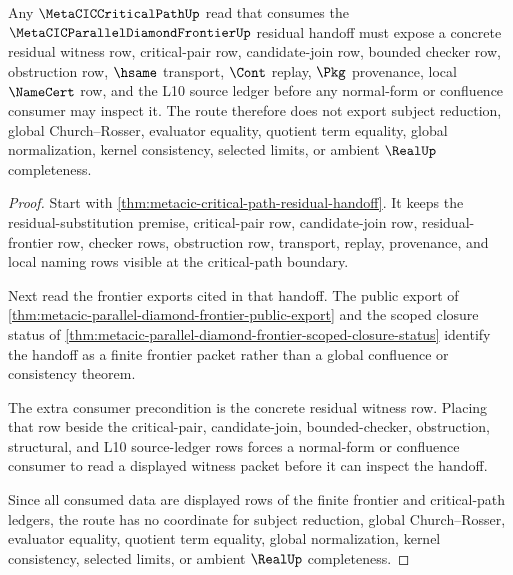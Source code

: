 \begin{theorem}
\label{thm:metacic-critical-path-residual-witness-consumption}
Any $\MetaCICCriticalPathUp$ read that consumes the $\MetaCICParallelDiamondFrontierUp$ residual handoff must expose a concrete residual witness row, critical-pair row, candidate-join row, bounded checker row, obstruction row, $\hsame$ transport, $\Cont$ replay, $\Pkg$ provenance, local $\NameCert$ row, and the L10 source ledger before any normal-form or confluence consumer may inspect it. The route therefore does not export subject reduction, global Church--Rosser, evaluator equality, quotient term equality, global normalization, kernel consistency, selected limits, or ambient $\RealUp$ completeness.
\end{theorem}
\begin{proof}
Start with \autoref{thm:metacic-critical-path-residual-handoff}. It keeps the residual-substitution premise, critical-pair row, candidate-join row, residual-frontier row, checker rows, obstruction row, transport, replay, provenance, and local naming rows visible at the critical-path boundary.

Next read the frontier exports cited in that handoff. The public export of \autoref{thm:metacic-parallel-diamond-frontier-public-export} and the scoped closure status of \autoref{thm:metacic-parallel-diamond-frontier-scoped-closure-status} identify the handoff as a finite frontier packet rather than a global confluence or consistency theorem.

The extra consumer precondition is the concrete residual witness row. Placing that row beside the critical-pair, candidate-join, bounded-checker, obstruction, structural, and L10 source-ledger rows forces a normal-form or confluence consumer to read a displayed witness packet before it can inspect the handoff.

Since all consumed data are displayed rows of the finite frontier and critical-path ledgers, the route has no coordinate for subject reduction, global Church--Rosser, evaluator equality, quotient term equality, global normalization, kernel consistency, selected limits, or ambient $\RealUp$ completeness.
\end{proof}
